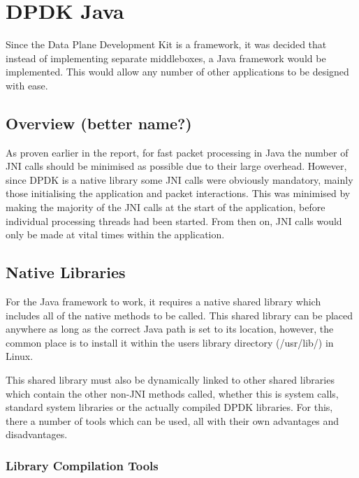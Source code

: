 \documentclass[final_report.tex]{subfiles}
\begin{document}
\section{DPDK Java}
Since the Data Plane Development Kit is a framework, it was decided that instead of implementing separate middleboxes, a Java framework would be implemented. This would allow any number of other applications to be designed with ease. 


\subsection{Overview (better name?)}
As proven earlier in the report, for fast packet processing in Java the number of JNI calls should be minimised as possible due to their large overhead. However, since DPDK is a native library some JNI calls were obviously mandatory, mainly those initialising the application and packet interactions. This was minimised by making the majority of the JNI calls at the start of the application, before individual processing threads had been started. From then on, JNI calls would only be made at vital times within the application.

\subsection{Native Libraries}
For the Java framework to work, it requires a native shared library which includes all of the native methods to be called. This shared library can be placed anywhere as long as the correct Java path is set to its location, however, the common place is to install it within the users library directory (/usr/lib/) in Linux.

This shared library must also be dynamically linked to other shared libraries which contain the other non-JNI methods called, whether this is system calls, standard system libraries or the actually compiled DPDK libraries. For this, there a number of tools which can be used, all with their own advantages and disadvantages.

\subsubsection{Library Compilation Tools}
\end{document}
